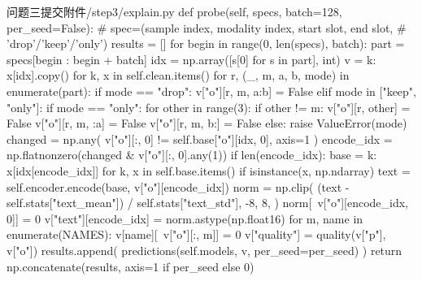 \begin{appendices}
\begin{Python}{问题三提交附件/step3/explain.py}
    def probe(self, specs, batch=128, per_seed=False):
        # spec=(sample index, modality index, start slot, end slot,
        #       'drop'/'keep'/'only')
        results = []
        for begin in range(0, len(specs), batch):
            part = specs[begin : begin + batch]
            idx = np.array([s[0] for s in part], int)
            v = {k: x[idx].copy() for k, x in self.clean.items()}
            for r, (_, m, a, b, mode) in enumerate(part):
                if mode == "drop":
                    v["o"][r, m, a:b] = False
                elif mode in ["keep", "only"]:
                    if mode == "only":
                        for other in range(3):
                            if other != m:
                                v["o"][r, other] = False
                    v["o"][r, m, :a] = False
                    v["o"][r, m, b:] = False
                else:
                    raise ValueError(mode)
            changed = np.any(
                v["o"][:, 0] != self.base["o"][idx, 0], axis=1
            )
            encode_idx = np.flatnonzero(changed & v["o"][:, 0].any(1))
            if len(encode_idx):
                base = {
                    k: x[idx[encode_idx]]
                    for k, x in self.base.items()
                    if isinstance(x, np.ndarray)
                }
                text = self.encoder.encode(base, v["o"][encode_idx])
                norm = np.clip(
                    (text - self.stats["text_mean"])
                    / self.stats["text_std"],
                    -8,
                    8,
                )
                norm[~v["o"][encode_idx, 0]] = 0
                v["text"][encode_idx] = norm.astype(np.float16)
            for m, name in enumerate(NAMES):
                v[name][~v["o"][:, m]] = 0
            v["quality"] = quality(v["p"], v["o"])
            results.append(
                predictions(self.models, v, per_seed=per_seed)
            )
        return np.concatenate(results, axis=1 if per_seed else 0)



\end{Python}
\end{appendices}
